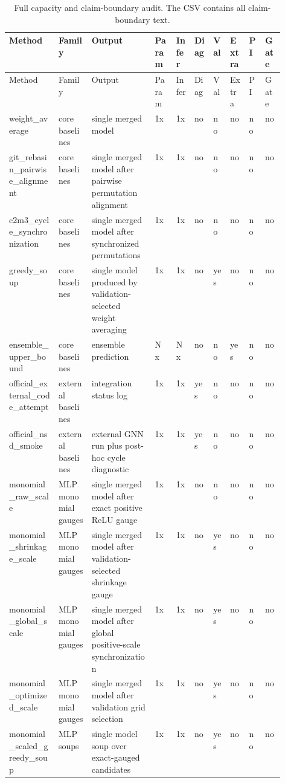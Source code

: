 \begin{longtable}{p{0.18\linewidth}p{0.12\linewidth}p{0.23\linewidth}lllllll}
\caption{Full capacity and claim-boundary audit. The CSV contains all claim-boundary text.}\\
\toprule
Method & Family & Output & Param & Infer & Diag & Val & Extra & PI & Gate \\
\midrule
\endfirsthead
\toprule
Method & Family & Output & Param & Infer & Diag & Val & Extra & PI & Gate \\
\midrule
\endhead
weight\_average & core baselines & single merged model & 1x & 1x & no & no & no & no & no \\
git\_rebasin\_pairwise\_alignment & core baselines & single merged model after pairwise permutation alignment & 1x & 1x & no & no & no & no & no \\
c2m3\_cycle\_synchronization & core baselines & single merged model after synchronized permutations & 1x & 1x & no & no & no & no & no \\
greedy\_soup & core baselines & single model produced by validation-selected weight averaging & 1x & 1x & no & yes & no & no & no \\
ensemble\_upper\_bound & core baselines & ensemble prediction & N x & N x & no & no & yes & no & no \\
official\_external\_code\_attempt & external baselines & integration status log & 1x & 1x & yes & no & no & no & no \\
official\_nsd\_smoke & external baselines & external GNN run plus post-hoc cycle diagnostic & 1x & 1x & yes & no & no & no & no \\
monomial\_raw\_scale & MLP monomial gauges & single merged model after exact positive ReLU gauge & 1x & 1x & no & no & no & no & no \\
monomial\_shrinkage\_scale & MLP monomial gauges & single merged model after validation-selected shrinkage gauge & 1x & 1x & no & yes & no & no & no \\
monomial\_global\_scale & MLP monomial gauges & single merged model after global positive-scale synchronization & 1x & 1x & no & yes & no & no & no \\
monomial\_optimized\_scale & MLP monomial gauges & single merged model after validation grid selection & 1x & 1x & no & yes & no & no & no \\
monomial\_scaled\_greedy\_soup & MLP soups & single model soup over exact-gauged candidates & 1x & 1x & no & yes & no & no & no \\

\end{longtable}
